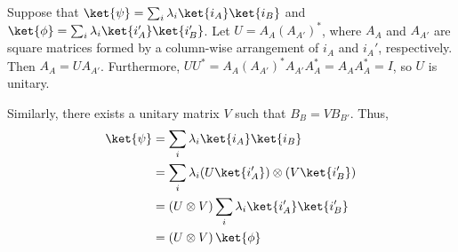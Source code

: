 \par Suppose that $\ket{\psi} = \sum_i{\lambda_i \ket{i_A} \ket{i_B}}$ and $\ket{\phi} = \sum_i{\lambda_i \ket{i_A'} \ket{i_B'}}$.
%
Let $U = A_A \left( A_{A'} \right)^*$, where $A_A$ and $A_{A'}$ are square matrices formed by a column-wise arrangement of ${i_A}$ and ${i_A'}$, respectively.
%
Then $A_A = U A_{A'}$.
%
Furthermore, $U U^* = A_A \left( A_{A'} \right)^* A_{A'} A_A^* = A_A A_A^* = I$, so $U$ is unitary.
%
\par Similarly, there exists a unitary matrix $V$ such that $B_B = V B_{B'}$.
%
Thus,
%
\begin{align}
\ket{\psi} &= \sum_i{\lambda_i \ket{i_A} \ket{i_B}} \\
&= \sum_i{\lambda_i (U \ket{i_A'}) \otimes (V \ket{i_B'})} \\
&= \left( U \otimes V \right) \sum_i{\lambda_i \ket{i_A'} \ket{i_B'}} \\
&= \left( U \otimes V \right) \ket{\phi}
\end{align}
